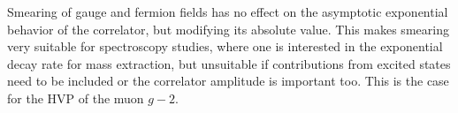 Smearing of gauge and fermion fields has no effect on the asymptotic exponential behavior of the correlator, but modifying its absolute value.
This makes smearing very suitable for spectroscopy studies, where one is interested in the exponential decay rate for mass extraction, but unsuitable if contributions from excited states need to be included or the correlator amplitude is important too.
This is the case for the HVP of the muon $g-2$.


